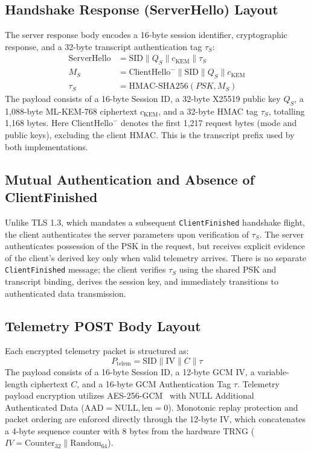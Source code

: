 \documentclass[journal, 10pt]{IEEEtran}
\begin{document}
\subsection{Handshake Response (ServerHello) Layout}
The server response body encodes a 16-byte session identifier, cryptographic response, and a 32-byte transcript authentication tag $\tau_S$:
\begin{equation}
\begin{aligned}
\text{ServerHello} &= \text{SID} \parallel Q_S \parallel c_{\text{KEM}} \parallel \tau_S \\
M_S &= \text{ClientHello}^{-} \parallel \text{SID} \parallel Q_S \parallel c_{\text{KEM}} \\
\tau_S &= \text{HMAC-SHA256}(PSK, M_S)
\end{aligned}
\end{equation}
The payload consists of a 16-byte Session ID, a 32-byte X25519 public key $Q_S$, a 1,088-byte ML-KEM-768 ciphertext $c_{\text{KEM}}$, and a 32-byte HMAC tag $\tau_S$, totalling 1,168 bytes. Here $\text{ClientHello}^{-}$ denotes the first 1,217 request bytes (mode and public keys), excluding the client HMAC. This is the transcript prefix used by both implementations.

\subsection{Mutual Authentication and Absence of ClientFinished}
Unlike TLS 1.3, which mandates a subsequent \texttt{ClientFinished} handshake flight, the client authenticates the server parameters upon verification of $\tau_S$. The server authenticates possession of the PSK in the request, but receives explicit evidence of the client's derived key only when valid telemetry arrives. There is no separate \texttt{ClientFinished} message; the client verifies $\tau_S$ using the shared PSK and transcript binding, derives the session key, and immediately transitions to authenticated data transmission.

\subsection{Telemetry POST Body Layout}
Each encrypted telemetry packet is structured as:
\begin{equation}
P_{\text{telem}} = \text{SID} \parallel \text{IV} \parallel C \parallel \tau
\end{equation}
The payload consists of a 16-byte Session ID, a 12-byte GCM IV, a variable-length ciphertext $C$, and a 16-byte GCM Authentication Tag $\tau$. Telemetry payload encryption utilizes AES-256-GCM~\cite{b22,b29,b35,b30} with NULL Additional Authenticated Data ($\text{AAD} = \text{NULL}, \text{len} = 0$). Monotonic replay protection and packet ordering are enforced directly through the 12-byte IV, which concatenates a 4-byte sequence counter with 8 bytes from the hardware TRNG ($IV = \text{Counter}_{32} \parallel \text{Random}_{64}$).
\end{document}
